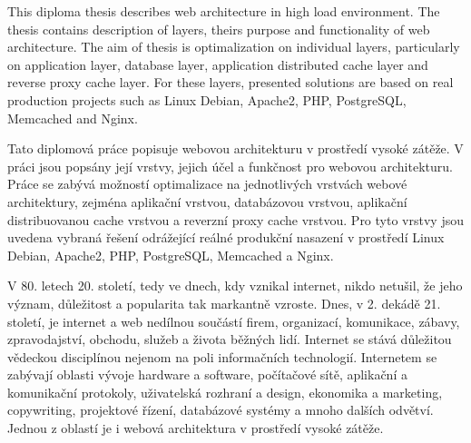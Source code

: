\documentclass[12pt]{article}
\begin{document}


{This diploma thesis describes web architecture in high load environment. The thesis contains description of layers, theirs purpose and functionality of web architecture. The aim of thesis is optimalization on individual layers, particularly on application layer, database layer, application distributed cache layer and reverse proxy cache layer. For these layers, presented solutions are based on real production projects such as Linux Debian, Apache2, PHP, PostgreSQL, Memcached and Nginx.}

{Tato diplomová práce popisuje webovou architekturu v prostředí vysoké zátěže. V práci jsou popsány její vrstvy, jejich účel a funkčnost pro webovou architekturu. Práce se zabývá možností optimalizace na jednotlivých vrstvách webové architektury, zejména aplikační vrstvou, databázovou vrstvou, aplikační distribuovanou cache vrstvou a reverzní proxy cache vrstvou. Pro tyto vrstvy jsou uvedena vybraná řešení odrážející reálné produkční nasazení v prostředí Linux Debian, Apache2, PHP, PostgreSQL, Memcached a Nginx.}


\obsah
{}


V 80. letech 20. století, tedy ve dnech, kdy vznikal internet, nikdo netušil, že jeho význam, důležitost a popularita tak markantně vzroste. Dnes, v 2. dekádě 21. století, je internet a web nedílnou součástí firem, organizací, komunikace, zábavy, zpravodajství, obchodu, služeb a života běžných lidí. Internet se stává důležitou vědeckou disciplínou nejenom na poli informačních technologií. Internetem se zabývají oblasti vývoje hardware a software, počítačové sítě, aplikační a komunikační protokoly, uživatelská rozhraní a design, ekonomika a marketing, copywriting, projektové řízení, databázové systémy a mnoho dalších odvětví. Jednou z oblastí je i webová architektura v prostředí vysoké zátěže.
\end{document}
